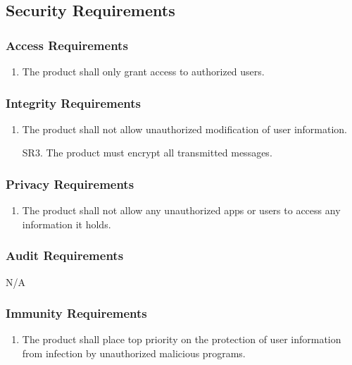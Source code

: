 \documentclass[]{article}
\begin{document}

\subsection{Security Requirements}
\label{sub:security_requirements}

\subsubsection{Access Requirements}
\label{ssub:access_requirements}
\begin{enumerate}[{SR}1. ]
	\item The product shall only grant access to authorized users.
\end{enumerate}

\subsubsection{Integrity Requirements}
\label{ssub:integrity_requirements}
\begin{enumerate}[{SR}2. ]
	\item The product shall not allow unauthorized modification of user information.
	\item[{SR}3. ] The product must encrypt all transmitted messages.
\end{enumerate}

\subsubsection{Privacy Requirements}
\label{ssub:privacy_requirements}
\begin{enumerate}[{SR}3. ]
	\item The product shall not allow any unauthorized apps or users to access any information it holds.
\end{enumerate}

\subsubsection{Audit Requirements}
\label{ssub:audit_requirements}
N/A

\subsubsection{Immunity Requirements}
\label{ssub:immunity_requirements}
\begin{enumerate}[{SR}4. ]
	\item The product shall place top priority on the protection of user information from infection by unauthorized malicious programs.
\end{enumerate}
\end{document}
